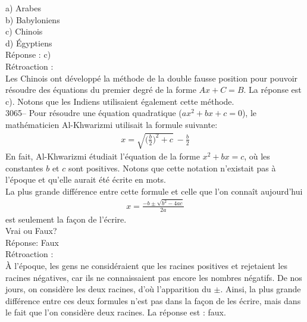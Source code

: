 \documentclass[letterpaper, 12pt]{article}
\begin{document}
a) Arabes\\
b) Babyloniens\\
c) Chinois\\
d) \'Egyptiens\\

R\'eponse : c)\\

R\'etroaction :\\
Les Chinois ont d\'evelopp\'e la m\'ethode de la double fausse position pour pouvoir r\'esoudre des \'equations du premier degr\'e de la forme $Ax + C = B$. La r\'eponse est c). Notons que les Indiens utilisaient \'egalement cette m\'ethode.\\



3065-- Pour r\'esoudre une \'equation quadratique ($ax^{2} + bx + c = 0$), le math\'ematicien Al-Khwarizmi utilisait la formule suivante:
\begin{eqnarray*}
x = \sqrt{\Big(\frac{b}{2}\Big)^{2} + c} \ - \frac{b}{2}
\end{eqnarray*}
En fait, Al-Khwarizmi \'etudiait l'\'equation de la forme $x^{2} + bx = c$, o\`u les constantes $b$ et $c$ sont positives. Notons que cette notation n'existait pas \`a l'\'epoque et qu'elle aurait \'et\'e \'ecrite en mots.\\

La plus grande diff\'erence entre cette formule et celle que l'on conna\^it aujourd'hui
\begin{eqnarray*}
x = \frac{-b \pm \sqrt{b^{2} - 4ac}}{2a}
\end{eqnarray*}
est seulement la fa\c con de l'\'ecrire.\\
Vrai ou Faux?\\

R\'eponse: Faux\\

R\'etroaction :\\
\`A l'\'epoque, les gens ne consid\'eraient que les racines positives et rejetaient les racines n\'egatives, car ils ne connaissaient pas encore les nombres n\'egatifs. De nos jours, on consid\`ere les deux racines, d'o\`u l'apparition du $\pm$. Ainsi, la plus grande diff\'erence entre ces deux formules n'est pas dans la fa\c con de les \'ecrire, mais dans le fait que l'on consid\`ere deux racines. La r\'eponse est : faux.\\



\end{document}
